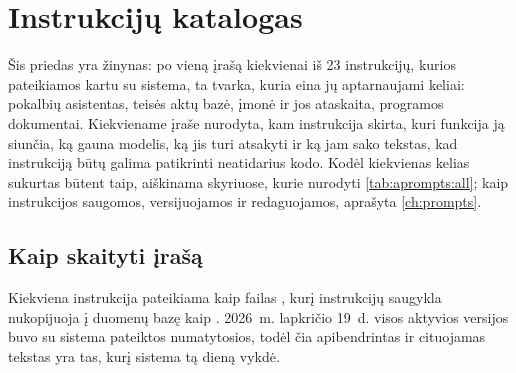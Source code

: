 \chapter{Instrukcijų katalogas}\label{app:prompts}

\providecommand{\apromptsfield}[1]{\par\addvspace{.5\baselineskip}\noindent{\sffamily\bfseries\color{ink}#1}\enspace\ignorespaces}
\providecommand{\apromptsneed}[1]{\par\begingroup\dimen0=#1\baselineskip\dimen2=\pagegoal\advance\dimen2 by -\pagetotal\ifdim\dimen0>\dimen2\ifdim\dimen2>0pt\vfil\fi\penalty-10000\fi\endgroup}

Šis priedas yra žinynas: po vieną įrašą kiekvienai iš 23 instrukcijų, kurios pateikiamos kartu
su sistema, ta tvarka, kuria eina jų aptarnaujami keliai: pokalbių asistentas, teisės aktų
bazė, įmonė ir jos ataskaita, programos dokumentai. Kiekviename įraše nurodyta, kam instrukcija
skirta, kuri funkcija ją siunčia, ką gauna modelis, ką jis turi atsakyti ir ką jam sako tekstas,
kad instrukciją būtų galima patikrinti neatidarius kodo. Kodėl kiekvienas kelias sukurtas būtent
taip, aiškinama skyriuose, kurie nurodyti \cref{tab:aprompts:all}; kaip instrukcijos saugomos,
versijuojamos ir redaguojamos, aprašyta \cref{ch:prompts}.

\section{Kaip skaityti įrašą}\label{sec:aprompts:reading}

Kiekviena instrukcija pateikiama kaip failas , kurį
instrukcijų saugykla nukopijuoja į duomenų bazę kaip . 2026~m.
lapkričio 19~d. visos aktyvios versijos buvo su sistema pateiktos numatytosios, todėl čia
apibendrintas ir cituojamas tekstas yra tas, kurį sistema tą dieną vykdė.

